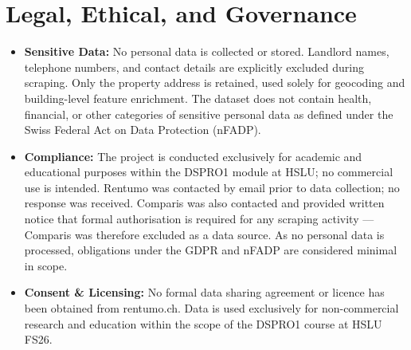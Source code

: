 \documentclass[11pt, a4paper]{article}
\begin{document}
\section{Legal, Ethical, and Governance}
\begin{itemize}
    \item \textbf{Sensitive Data:} No personal data is collected or stored. Landlord names, telephone numbers, and contact details are explicitly excluded during scraping. Only the property address is retained, used solely for geocoding and building-level feature enrichment. The dataset does not contain health, financial, or other categories of sensitive personal data as defined under the Swiss Federal Act on Data Protection (nFADP).
    \item \textbf{Compliance:} The project is conducted exclusively for academic and educational purposes within the DSPRO1 module at HSLU; no commercial use is intended. Rentumo was contacted by email prior to data collection; no response was received. Comparis was also contacted and provided written notice that formal authorisation is required for any scraping activity --- Comparis was therefore excluded as a data source. As no personal data is processed, obligations under the GDPR and nFADP are considered minimal in scope.
    \item \textbf{Consent \& Licensing:} No formal data sharing agreement or licence has been obtained from rentumo.ch. Data is used exclusively for non-commercial research and education within the scope of the DSPRO1 course at HSLU FS26.
\end{itemize}

\end{document}
